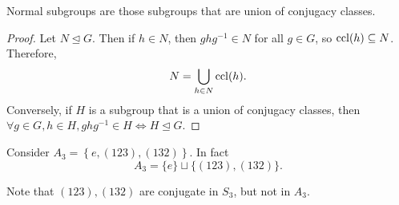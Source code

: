 \documentclass[10pt]{article}
\def\ltrigeq{\trianglelefteq}
\begin{document}
      \begin{proposition}\label{prop:5.23}
          Normal subgroups are those subgroups that are union of conjugacy classes.
      \end{proposition}
      \begin{proof}
          Let $ N \ltrigeq G $. Then if $ h\in N $, then $ghg^{-1}\in N$ for all $g\in G$, so $ \operatorname{ccl}(h) \subseteq N $. Therefore, 
          \[
              N=\bigcup_{h\in N} \operatorname{ccl}(h)
          .\]
          Conversely, if $H$ is a subgroup that is a union of conjugacy classes, then $ \forall g\in G, h\in H, ghg^{-1}\in H \Leftrightarrow H \ltrigeq G $.
      \end{proof}
      \begin{example}
          Consider $ A_3=\left\{ e,(123),(132) \right\} $. In fact 
          \[
              A_3 = \{e\}\sqcup \{(123),(132)\}
          .\]
      \end{example}
      \begin{remark}
          Note that $ (123),(132) $ are conjugate in $S_3$, but not in $A_3$.
      \end{remark}
\end{document}
